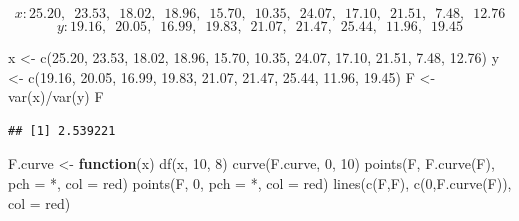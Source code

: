 \documentclass[
]{book}
\newenvironment{Shaded}{\begin{snugshade}}{\end{snugshade}}
\newcommand{\AttributeTok}[1]{\textcolor[rgb]{0.77,0.63,0.00}{#1}}
\newcommand{\ControlFlowTok}[1]{\textcolor[rgb]{0.13,0.29,0.53}{\textbf{#1}}}
\newcommand{\DecValTok}[1]{\textcolor[rgb]{0.00,0.00,0.81}{#1}}
\newcommand{\FloatTok}[1]{\textcolor[rgb]{0.00,0.00,0.81}{#1}}
\newcommand{\FunctionTok}[1]{\textcolor[rgb]{0.00,0.00,0.00}{#1}}
\newcommand{\NormalTok}[1]{#1}
\newcommand{\OtherTok}[1]{\textcolor[rgb]{0.56,0.35,0.01}{#1}}
\newcommand{\SpecialCharTok}[1]{\textcolor[rgb]{0.00,0.00,0.00}{#1}}
\newcommand{\StringTok}[1]{\textcolor[rgb]{0.31,0.60,0.02}{#1}}
\begin{document}
\[x:25.20,\,\,\, 23.53,\,\,\, 18.02,\,\,\, 18.96,\,\,\, 15.70, \,\,\,10.35, \,\,\,24.07,\,\,\, 17.10, \,\,\,21.51, \,\,\, 7.48, \,\,\,12.76 \]
\[y: 19.16,\,\,\, 20.05, \,\,\,16.99,\,\,\, 19.83,\,\,\, 21.07,\,\,\, 21.47,\,\,\, 25.44,\,\,\, 11.96,\,\,\, 19.45\]

\begin{Shaded}
\begin{Highlighting}[]
\NormalTok{x }\OtherTok{\textless{}{-}} \FunctionTok{c}\NormalTok{(}\FloatTok{25.20}\NormalTok{, }\FloatTok{23.53}\NormalTok{, }\FloatTok{18.02}\NormalTok{, }\FloatTok{18.96}\NormalTok{, }\FloatTok{15.70}\NormalTok{, }\FloatTok{10.35}\NormalTok{, }\FloatTok{24.07}\NormalTok{, }\FloatTok{17.10}\NormalTok{, }\FloatTok{21.51}\NormalTok{,  }\FloatTok{7.48}\NormalTok{, }\FloatTok{12.76}\NormalTok{)}
\NormalTok{y }\OtherTok{\textless{}{-}} \FunctionTok{c}\NormalTok{(}\FloatTok{19.16}\NormalTok{, }\FloatTok{20.05}\NormalTok{, }\FloatTok{16.99}\NormalTok{, }\FloatTok{19.83}\NormalTok{, }\FloatTok{21.07}\NormalTok{, }\FloatTok{21.47}\NormalTok{, }\FloatTok{25.44}\NormalTok{, }\FloatTok{11.96}\NormalTok{, }\FloatTok{19.45}\NormalTok{)}
\NormalTok{F }\OtherTok{\textless{}{-}} \FunctionTok{var}\NormalTok{(x)}\SpecialCharTok{/}\FunctionTok{var}\NormalTok{(y)}
\NormalTok{F}
\end{Highlighting}
\end{Shaded}

\begin{verbatim}
## [1] 2.539221
\end{verbatim}

\begin{Shaded}
\begin{Highlighting}[]
\NormalTok{F.curve }\OtherTok{\textless{}{-}} \ControlFlowTok{function}\NormalTok{(x) }\FunctionTok{df}\NormalTok{(x, }\DecValTok{10}\NormalTok{, }\DecValTok{8}\NormalTok{)}
\FunctionTok{curve}\NormalTok{(F.curve, }\DecValTok{0}\NormalTok{, }\DecValTok{10}\NormalTok{)}
\FunctionTok{points}\NormalTok{(F, }\FunctionTok{F.curve}\NormalTok{(F), }\AttributeTok{pch =} \StringTok{\textquotesingle{}*\textquotesingle{}}\NormalTok{, }\AttributeTok{col =} \StringTok{\textquotesingle{}red\textquotesingle{}}\NormalTok{)}
\FunctionTok{points}\NormalTok{(F, }\DecValTok{0}\NormalTok{, }\AttributeTok{pch =} \StringTok{\textquotesingle{}*\textquotesingle{}}\NormalTok{, }\AttributeTok{col =} \StringTok{\textquotesingle{}red\textquotesingle{}}\NormalTok{)}
\FunctionTok{lines}\NormalTok{(}\FunctionTok{c}\NormalTok{(F,F), }\FunctionTok{c}\NormalTok{(}\DecValTok{0}\NormalTok{,}\FunctionTok{F.curve}\NormalTok{(F)), }\AttributeTok{col =} \StringTok{\textquotesingle{}red\textquotesingle{}}\NormalTok{)}
\end{Highlighting}
\end{Shaded}
\end{document}
